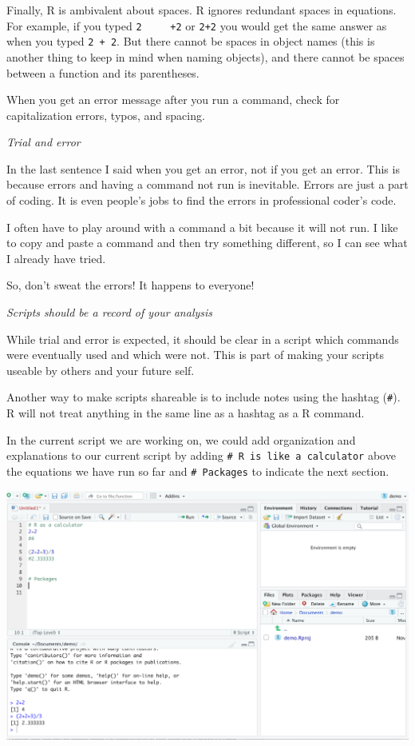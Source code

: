 \documentclass[
]{book}
\begin{document}
Finally, R is ambivalent about spaces. R ignores redundant spaces in equations. For example, if you typed \texttt{2\ \ \ \ \ +2} or \texttt{2+2} you would get the same answer as when you typed \texttt{2\ +\ 2}. But there cannot be spaces in object names (this is another thing to keep in mind when naming objects), and there cannot be spaces between a function and its parentheses.

When you get an error message after you run a command, check for capitalization errors, typos, and spacing.

\emph{Trial and error}

In the last sentence I said when you get an error, not if you get an error. This is because errors and having a command not run is inevitable. Errors are just a part of coding. It is even people's jobs to find the errors in professional coder's code.

I often have to play around with a command a bit because it will not run. I like to copy and paste a command and then try something different, so I can see what I already have tried.

So, don't sweat the errors! It happens to everyone!

\emph{Scripts should be a record of your analysis}

While trial and error is expected, it should be clear in a script which commands were eventually used and which were not. This is part of making your scripts useable by others and your future self.

Another way to make scripts shareable is to include notes using the hashtag (\texttt{\#}). R will not treat anything in the same line as a hashtag as a R command.

In the current script we are working on, we could add organization and explanations to our current script by adding \texttt{\#\ R\ is\ like\ a\ calculator} above the equations we have run so far and \texttt{\#\ Packages} to indicate the next section.

\includegraphics{img/NAVIGATING AND COMMANDS R111.png}
\end{document}
